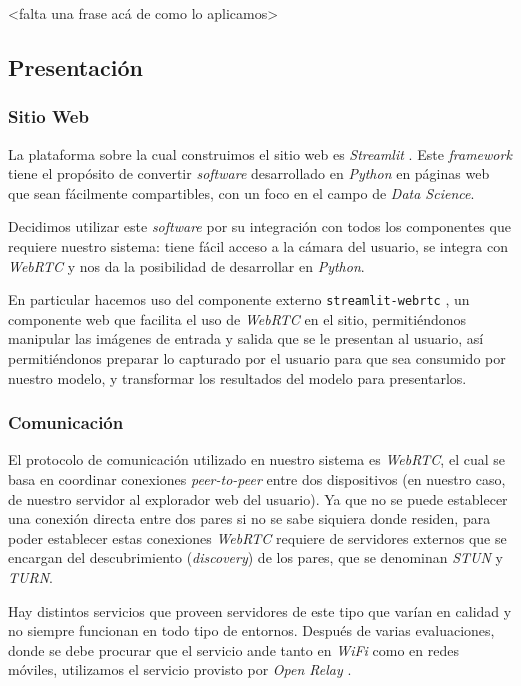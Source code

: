 \documentclass[a4paper]{article}
\begin{document}
<falta una frase acá de como lo aplicamos>

\subsection{Presentación}

\subsubsection{Sitio Web}

La plataforma sobre la cual construimos el sitio web es \textit{Streamlit} \cite{streamlit}. Este \textit{framework} tiene el propósito de convertir \textit{software} desarrollado en \textit{Python} en páginas web que sean fácilmente compartibles, con un foco en el campo de \textit{Data Science}.

Decidimos utilizar este \textit{software} por su integración con todos los componentes que requiere nuestro sistema: tiene fácil acceso a la cámara del usuario, se integra con \textit{WebRTC} y nos da la posibilidad de desarrollar en \textit{Python}.

En particular hacemos uso del componente externo \texttt{streamlit-webrtc} \cite{streamlit-webrtc}, un componente web que facilita el uso de \textit{WebRTC} en el sitio, permitiéndonos manipular las imágenes de entrada y salida que se le presentan al usuario, así permitiéndonos preparar lo capturado por el usuario para que sea consumido por nuestro modelo, y transformar los resultados del modelo para presentarlos.

\subsubsection{Comunicación}

El protocolo de comunicación utilizado en nuestro sistema es \textit{WebRTC}, el cual se basa en coordinar conexiones \textit{peer-to-peer} entre dos dispositivos (en nuestro caso, de nuestro servidor al explorador web del usuario). Ya que no se puede establecer una conexión directa entre dos pares si no se sabe siquiera donde residen, para poder establecer estas conexiones \textit{WebRTC} requiere de servidores externos que se encargan del descubrimiento (\textit{discovery}) de los pares, que se denominan \textit{STUN} y \textit{TURN}.

Hay distintos servicios que proveen servidores de este tipo que varían en calidad y no siempre funcionan en todo tipo de entornos. Después de varias evaluaciones, donde se debe procurar que el servicio ande tanto en \textit{WiFi} como en redes móviles, utilizamos el servicio provisto por \textit{Open Relay} \cite{openrelay}.
\end{document}
